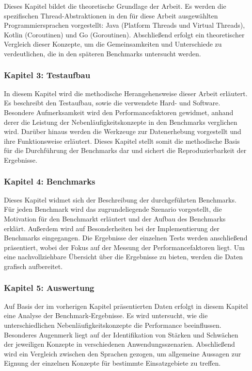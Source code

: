 \documentclass[fontsize=12pt,paper=a4,twoside=semi,parskip=half-,headsepline,headinclude]{scrreprt}
\begin{document}
Dieses Kapitel bildet die theoretische Grundlage der Arbeit. Es werden die spezifischen Thread-Abstraktionen in den für diese Arbeit ausgewählten Programmiersprachen vorgestellt: Java (Platform Threads und Virtual Threads), Kotlin (Coroutinen) und Go (Goroutinen). Abschließend erfolgt ein theoretischer Vergleich dieser Konzepte, um die Gemeinsamkeiten und Unterschiede zu verdeutlichen, die in den späteren Benchmarks untersucht werden.

\subsubsection{Kapitel 3: Testaufbau}

In diesem Kapitel wird die methodische Herangehensweise dieser Arbeit erläutert. Es beschreibt den Testaufbau, sowie die verwendete Hard- und Software. Besondere Aufmerksamkeit wird den Performancefaktoren gewidmet, anhand derer die Leistung der Nebenläufigkeitskonzepte in den Benchmarks verglichen wird. Darüber hinaus werden die Werkzeuge zur Datenerhebung vorgestellt und ihre Funktionsweise erläutert. Dieses Kapitel stellt somit die methodische Basis für die Durchführung der Benchmarks dar und sichert die Reproduzierbarkeit der Ergebnisse.

\subsubsection{Kapitel 4: Benchmarks}

Dieses Kapitel widmet sich der Beschreibung der durchgeführten Benchmarks. Für jeden Benchmark wird das zugrundeliegende Szenario vorgestellt, die Motivation für den Benchmarkt erläutert und der Aufbau des Benchmarks erklärt. Außerdem wird auf Besonderheiten bei der Implementierung der Benchmarks eingegangen. Die Ergebnisse der einzelnen Tests werden anschließend präsentiert, wobei der Fokus auf der Messung der Performancefaktoren liegt. Um eine nachvollziehbare Übersicht über die Ergebnisse zu bieten, werden die Daten grafisch aufbereitet.

\subsubsection{Kapitel 5: Auswertung}

Auf Basis der im vorherigen Kapitel präsentierten Daten erfolgt in diesem Kapitel eine Analyse der Benchmark-Ergebnisse. Es wird untersucht, wie die unterschiedlichen Nebenläufigkeitskonzepte die Performance beeinflussen. Besonderes Augenmerk liegt auf der Identifikation von Stärken und Schwächen der jeweiligen Konzepte in verschiedenen Anwendungsszenarien. Abschließend wird ein Vergleich zwischen den Sprachen gezogen, um allgemeine Aussagen zur Eignung der einzelnen Konzepte für bestimmte Einsatzgebiete zu treffen.
\end{document}
